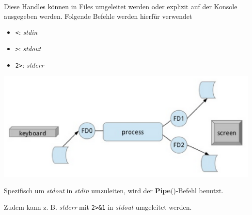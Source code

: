 \documentclass[
  9pt,
  a4paperpaper,
  DIV=11]{scrartcl}
\newenvironment{Shaded}{}{}
\newcommand{\NormalTok}[1]{\textcolor[rgb]{0.14,0.16,0.18}{#1}}
\providecommand{\tightlist}{%
  \setlength{\itemsep}{0pt}\setlength{\parskip}{0pt}}\usepackage{longtable,booktabs,array}
\numberwithin{equation}{section}
\begin{document}
\begin{multicols}{2}
Diese Handles können in Files umgeleitet werden oder explizit auf der
Konsole ausgegeben werden. Folgende Befehle werden hierfür verwendet

\begin{itemize}
\tightlist
\item
  \texttt{\textless{}}: \emph{stdin}
\item
  \texttt{\textgreater{}}: \emph{stdout}
\item
  \texttt{2\textgreater{}}: \emph{stderr}
\end{itemize}

\includegraphics{images/RedirectedFileHandle.png}

\begin{Shaded}
\end{Shaded}

Spezifisch um \emph{stdout} in \emph{stdin} umzuleiten, wird der
\textbf{Pipe}(\textbar)-Befehl benutzt.

\begin{Shaded}
\end{Shaded}

Zudem kann z. B. \emph{stderr} mit \texttt{2\textgreater{}\&1} in
\emph{stdout} umgeleitet werden.


\end{multicols}
\end{document}
